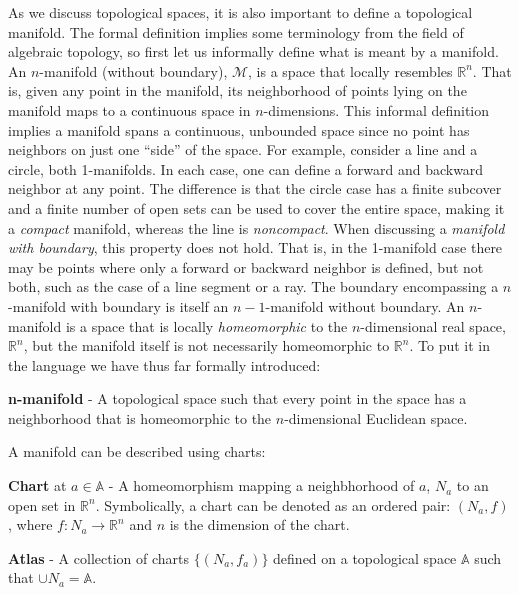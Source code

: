As we discuss topological spaces, it is also important to define a topological manifold.
%
The formal definition implies some terminology from the field of algebraic topology, so first let us informally define what is meant by a manifold.
%
An $n$-manifold (without boundary), $\mathcal{M}$, is a space that locally resembles $\mathbb{R}^n$.
%
That is, given any point in the manifold, its neighborhood of points lying on the manifold maps to a continuous space in $n$-dimensions.
%
This informal definition implies a manifold spans a continuous, unbounded space since no point has neighbors on just one ``side'' of the space.
%
For example, consider a line and a circle, both 1-manifolds.
%
In each case, one can define a forward and backward neighbor at any point.
%
The difference is that the circle case has a finite subcover and a finite number of open sets can be used to cover the entire space, making it a \emph{compact} manifold, whereas the line is \emph{noncompact}.
%
When discussing a \emph{manifold with boundary}, this property does not hold.
%
That is, in the 1-manifold case there may be points where only a forward or backward neighbor is defined, but not both, such as the case of a line segment or a ray.
%
The boundary encompassing a $n$-manifold with boundary is itself an $n-1$-manifold without boundary.
%
An $n$-manifold is a space that is locally \emph{homeomorphic} to the $n$-dimensional real space, $\mathbb{R}^n$, but the manifold itself is not necessarily homeomorphic to $\mathbb{R}^n$.
%
To put it in the language we have thus far formally introduced:

\begin{defn}
  \textbf{n-manifold} - A topological space such that every point in the space has a neighborhood that is homeomorphic to the $n$-dimensional Euclidean space.
\end{defn}

A manifold can be described using charts:

\begin{defn}
  \textbf{Chart} at $a \in \mathbb{A}$ - A homeomorphism mapping a neighbhorhood of $a$, $N_a$ to an open set in $\mathbb{R}^n$. Symbolically, a chart can be denoted as an ordered pair: $(N_a,f)$, where $f: N_a \rightarrow \mathbb{R}^n$ and $n$ is the dimension of the chart.
\end{defn}

\begin{defn}
  \textbf{Atlas} - A collection of charts $\{(N_a,f_a)\}$ defined on a topological space $\mathbb{A}$ such that $\cup N_a = \mathbb{A}$.
\end{defn}

